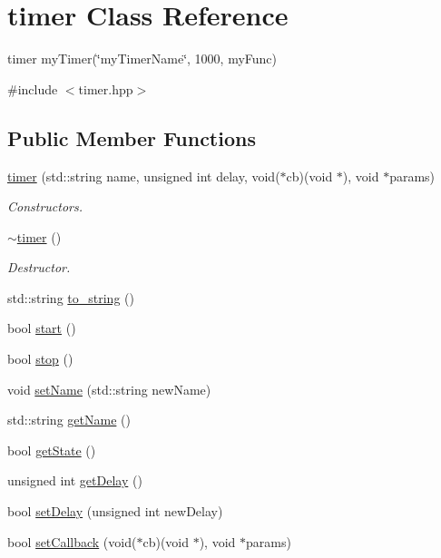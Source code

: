\hypertarget{classtimer}{}\section{timer Class Reference}
\label{classtimer}


timer my\+Timer(\char`\"{}my\+Timer\+Name\char`\"{}, 1000, my\+Func)  




{\ttfamily \#include $<$timer.\+hpp$>$}

\subsection*{Public Member Functions}
\begin{DoxyCompactItemize}
\item 
\hyperlink{classtimer_ac8d672339f972a1146ea2d90ca2ef89a}{timer} (std\+::string name, unsigned int delay, void($\ast$cb)(void $\ast$), void $\ast$params)
\begin{DoxyCompactList}\small\item\em Constructors. \end{DoxyCompactList}\item 
\mbox{\label{classtimer_aee05958ea6b0fbf36ea1fd22747cd546}} 
\hyperlink{classtimer_aee05958ea6b0fbf36ea1fd22747cd546}{$\sim$timer} ()
\begin{DoxyCompactList}\small\item\em Destructor. \end{DoxyCompactList}\item 
std\+::string \hyperlink{classtimer_a8c068c53de6269fc3ced75cf27bf4ea6}{to\+\_\+string} ()
\item 
bool \hyperlink{classtimer_adad85b4705278d4cb8a2a4f3286cc2c7}{start} ()
\item 
bool \hyperlink{classtimer_ad21a0c9113d870f8485b775f1fcd3c73}{stop} ()
\item 
void \hyperlink{classtimer_ae3dce84bbcd9a7022a20e2b63174aa61}{set\+Name} (std\+::string new\+Name)
\item 
std\+::string \hyperlink{classtimer_a30d5e497b9bee9b2d00c7f511c85e84d}{get\+Name} ()
\item 
bool \hyperlink{classtimer_a35c72b981bb55b98e979f83a988f434c}{get\+State} ()
\item 
unsigned int \hyperlink{classtimer_ab00cba4ccf638a425b9f6db10d2fd16f}{get\+Delay} ()
\item 
bool \hyperlink{classtimer_acd8ddd948bf96185cf3c1e0a4cf60264}{set\+Delay} (unsigned int new\+Delay)
\item 
bool \hyperlink{classtimer_a75f1f309bb222687385ede7d2d8233c3}{set\+Callback} (void($\ast$cb)(void $\ast$), void $\ast$params)
\end{DoxyCompactItemize}


